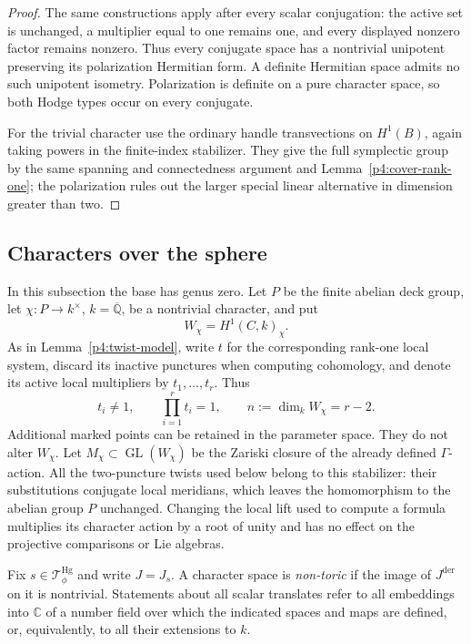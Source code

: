 \documentclass[11pt]{article}
\newcommand{\C}{\mathbb C}
\newcommand{\Qbar}{\overline{\mathbb Q}}
\theoremstyle{plain}
\theoremstyle{definition}
\theoremstyle{remark}
\numberwithin{equation}{section}
\begin{document}
\begin{proof}
The same constructions apply after every scalar conjugation: the
active set is unchanged, a multiplier equal to one remains one, and
every displayed nonzero factor remains nonzero.  Thus every conjugate
space has a nontrivial unipotent preserving its polarization Hermitian
form.  A definite Hermitian space admits no such unipotent isometry.
Polarization is definite on a pure character space, so both Hodge
types occur on every conjugate.

For the trivial character use the ordinary handle transvections on
$H^1(B)$, again taking powers in the finite-index stabilizer.  They
give the full symplectic group by the same spanning and connectedness
argument and Lemma~\ref{p4:cover-rank-one}; the polarization rules out the
larger special linear alternative in dimension greater than two.
\end{proof}


\subsection{Characters over the sphere}
\label{p4:sphere}

In this subsection the base has genus zero.  Let $P$ be the finite
abelian deck group, let $\chi:P\to k^\times$, $k=\Qbar$, be a
nontrivial character, and put
\[
 W_\chi=H^1(C,k)_\chi.
\]
As in Lemma~\ref{p4:twist-model}, write $t$ for the corresponding
rank-one local system, discard its inactive punctures when computing
cohomology, and denote its active local multipliers by
$t_1,\ldots,t_r$.  Thus
\begin{equation}\label{p4:sphere-dimension}
 t_i\ne1,\qquad \prod_{i=1}^r t_i=1,\qquad
 n:=\dim_k W_\chi=r-2.
\end{equation}
Additional marked points can be retained in the parameter space.  They
do not alter $W_\chi$.  Let
$M_\chi\subset\operatorname{GL}(W_\chi)$ be the Zariski closure of the
already defined $\Gamma$-action.
All the two-puncture twists used below belong to this stabilizer:
their substitutions conjugate local meridians, which leaves the
homomorphism to the abelian group $P$ unchanged.  Changing the local
lift used to compute a formula multiplies its character action by a
root of unity and has no effect on the projective comparisons or Lie
algebras.

Fix $s\in\mathcal T_\phi^{\mathrm{Hg}}$ and write $J=J_s$.
A character space is
\emph{non-toric} if the image of $J^{\mathrm{der}}$ on it is nontrivial.
Statements about all scalar translates refer to all embeddings into
$\C$ of a number field over which the indicated spaces and maps are
defined, or, equivalently, to all their extensions to $k$.
\end{document}
